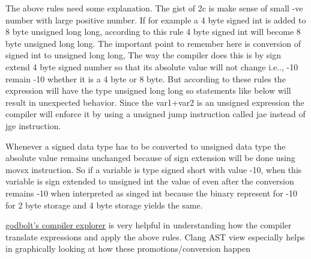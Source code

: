 \documentclass{article}
\begin{document}
The above rules need some explanation. The gist of 2c is make sense of small -ve
number with large positive number. If for example a 4 byte signed int is added
to 8 byte unsigned long long, according to this rule 4 byte signed int will
become 8 byte unsigned long long. The important point to remember here is
conversion of signed int to unsigned long long, The way the compiler does this
 is by sign extend 4 byte signed number so that its absolute value will not
 change
i.e.., -10 remain -10 whether it is a 4 byte or 8 byte. But according to these
rules the expression will have the type unsigned long long so statements like
below will result in unexpected behavior. Since the var1+var2 is an unsigned
expression the compiler will enforce it by using a unsigned jump instruction
called jae instead of jge instruction.

Whenever a signed data type has to be converted to unsigned data type the
absolute value remains unchanged because of sign extension will be done using
movsx instruction. So if a variable is type signed short with value -10, when
this variable is sign extended to unsigned int the value of even after the
conversion remains -10 when interpreted as singed int because the binary
represent for -10 for 2 byte storage and 4 byte storage yields the same.

\href{https://godbolt.org/}{godbolt's compiler explorer} is very helpful in
understanding how the compiler translate expressions and apply the above rules.
Clang AST view especially helps in graphically looking at how these
promotions/conversion happen
\end{document}
